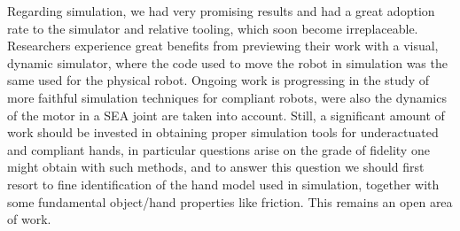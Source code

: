 \documentclass[%
	paper=A4,					%
	twoside=true,				%
	openright,			.
	parskip=full,				%
	chapterprefix=true,			%
	11pt,						%
	headings=normal,			%
	bibliography=totoc,			%
	listof=totoc,				%
	titlepage=on,				%
	captions=tableabove,		%
	draft=true,				%
]{scrreprt}%
\begin{document}
Regarding simulation, we had very promising results and had a great adoption rate to the simulator and relative tooling, which soon become irreplaceable. Researchers experience great benefits from previewing their work with a visual, dynamic simulator, where the code used to move the robot in simulation was the same used for the physical robot. Ongoing work is progressing in the study of  more faithful simulation techniques for compliant robots, were also the dynamics of the motor in a SEA joint are taken into account. Still, a significant amount of work should be invested in obtaining proper simulation tools for underactuated and compliant hands, in particular questions arise on the grade of fidelity one might obtain with such methods, and to answer this question we should first resort to fine identification of the hand model used in simulation, together with some fundamental object/hand properties like friction. This remains an open area of work.
\end{document}

